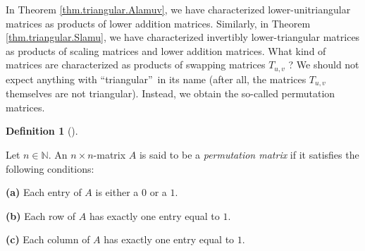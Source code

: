 \documentclass[numbers=enddot,12pt,final,onecolumn,notitlepage]{scrartcl}%
\theoremstyle{definition}
\newtheorem{defi}[theo]{Definition}
\newenvironment{definition}[1][]
{\begin{defi}[#1]\begin{leftbar}}
{\end{leftbar}\end{defi}}
\begin{document}
In Theorem \ref{thm.triangular.Alamuv}, we have characterized
lower-unitriangular matrices as products of lower addition matrices.
Similarly, in Theorem \ref{thm.triangular.Slamu}, we have characterized
invertibly lower-triangular matrices as products of scaling matrices and lower
addition matrices. What kind of matrices are characterized as products of
swapping matrices $T_{u,v}$ ? We should not expect anything with
\textquotedblleft triangular\textquotedblright\ in its name (after all, the
matrices $T_{u,v}$ themselves are not triangular). Instead, we obtain the
so-called permutation matrices.

\begin{definition}
\label{def.permat}Let $n\in\mathbb{N}$. An $n\times n$-matrix $A$ is said to
be a \textit{permutation matrix} if it satisfies the following conditions:

\textbf{(a)} Each entry of $A$ is either a $0$ or a $1$.

\textbf{(b)} Each row of $A$ has exactly one entry equal to $1$.

\textbf{(c)} Each column of $A$ has exactly one entry equal to $1$.
\end{definition}
\end{document}
